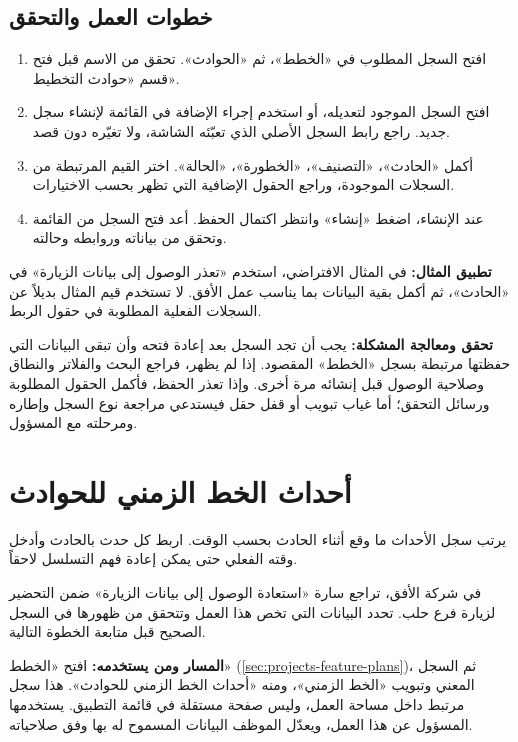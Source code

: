 \subsection{خطوات العمل والتحقق}
\begin{enumerate}
\item افتح السجل المطلوب في «الخطط»، ثم «الحوادث». تحقق من الاسم قبل فتح قسم «حوادث التخطيط».
\item افتح السجل الموجود لتعديله، أو استخدم إجراء الإضافة في القائمة لإنشاء سجل جديد. راجع رابط السجل الأصلي الذي تعبّئه الشاشة، ولا تغيّره دون قصد.
\item أكمل «الحادث»، «التصنيف»، «الخطورة»، «الحالة». اختر القيم المرتبطة من السجلات الموجودة، وراجع الحقول الإضافية التي تظهر بحسب الاختيارات.
\item عند الإنشاء، اضغط «إنشاء» وانتظر اكتمال الحفظ. أعد فتح السجل من القائمة وتحقق من بياناته وروابطه وحالته.
\end{enumerate}

\textbf{تطبيق المثال:} في المثال الافتراضي، استخدم «تعذر الوصول إلى بيانات الزيارة» في «الحادث»، ثم أكمل بقية البيانات بما يناسب عمل الأفق. لا تستخدم قيم المثال بديلاً عن السجلات الفعلية المطلوبة في حقول الربط.

\textbf{تحقق ومعالجة المشكلة:} يجب أن تجد السجل بعد إعادة فتحه وأن تبقى البيانات التي حفظتها مرتبطة بسجل «الخطط» المقصود. إذا لم يظهر، فراجع البحث والفلاتر والنطاق وصلاحية الوصول قبل إنشائه مرة أخرى. وإذا تعذر الحفظ، فأكمل الحقول المطلوبة ورسائل التحقق؛ أما غياب تبويب أو قفل حقل فيستدعي مراجعة نوع السجل وإطاره ومرحلته مع المسؤول.

\clearpage
\section{أحداث الخط الزمني للحوادث}
\label{sec:projects-feature-planning-incident-events}

يرتب سجل الأحداث ما وقع أثناء الحادث بحسب الوقت. اربط كل حدث بالحادث وأدخل وقته الفعلي حتى يمكن إعادة فهم التسلسل لاحقاً.

\begin{rcnote}
في شركة الأفق، تراجع سارة «استعادة الوصول إلى بيانات الزيارة» ضمن التحضير لزيارة فرع حلب. تحدد البيانات التي تخص هذا العمل وتتحقق من ظهورها في السجل الصحيح قبل متابعة الخطوة التالية.
\end{rcnote}

\textbf{المسار ومن يستخدمه:} افتح «الخطط» (\ref{sec:projects-feature-plans})، ثم السجل المعني وتبويب «الخط الزمني»، ومنه «أحداث الخط الزمني للحوادث». هذا سجل مرتبط داخل مساحة العمل، وليس صفحة مستقلة في قائمة التطبيق. يستخدمها المسؤول عن هذا العمل، ويعدّل الموظف البيانات المسموح له بها وفق صلاحياته.

